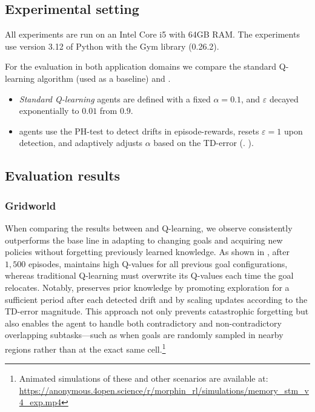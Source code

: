 \subsection{Experimental setting}
All experiments are run on an Intel Core i5 with 64GB RAM. The experiments use version 3.12 of Python with the Gym library (0.26.2). 

For the evaluation in both application domains we compare the standard Q-learning algorithm (used as a baseline) and \adaptiverl.
\begin{itemize}
  \item \emph{Standard Q-learning} agents are defined with a fixed $\alpha=0.1$, and $\varepsilon$ decayed exponentially to $0.01$ from $0.9$.
  \item \adaptiverl agents use the PH-test to detect drifts in episode-rewards, resets $\varepsilon\!=\!1$ upon detection, and adaptively adjusts $\alpha$ based on the TD-error (\cf. ).  
\end{itemize}

\subsection{Evaluation results}

\subsubsection{Gridworld}

When comparing the results between \adaptiverl and Q-learning, we observe \adaptiverl consistently 
outperforms the base line in adapting to changing goals and acquiring new policies without forgetting 
previously learned knowledge. As shown in , after $1,500$ episodes, \adaptiverl 
maintains high Q-values for all previous goal configurations, whereas traditional Q-learning must 
overwrite its Q-values each time the goal relocates. Notably, \adaptiverl preserves prior knowledge by 
promoting exploration for a sufficient period after each detected drift and by scaling updates according 
to the TD-error magnitude. This approach not only prevents catastrophic forgetting but also enables 
the agent to handle both contradictory and non-contradictory overlapping subtasks---such as when 
goals are randomly sampled in nearby regions rather than at the exact same cell.\footnote{Animated simulations of these and other scenarios are available at: \url{https://anonymous.4open.science/r/morphin_rl/simulations/memory_stm_v4_exp.mp4}}

